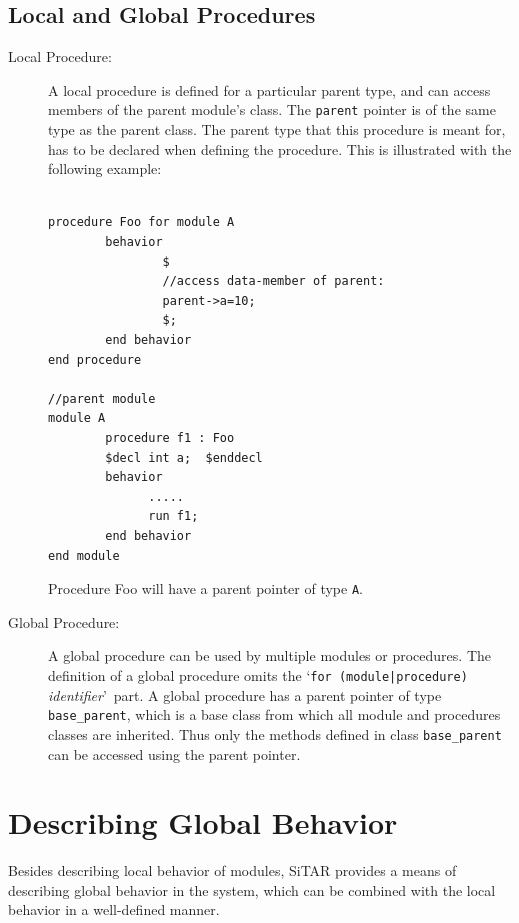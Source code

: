 \documentclass[12pt,a4paper]{report}
\begin{document}
	\subsection{Local and Global Procedures}
	\begin{description}
	\item[Local Procedure:] A local procedure is defined for a
	particular parent type, and can access members of the parent module's class.
	The \texttt{parent} pointer is of the same type as the parent class.
	The parent type that this procedure is meant for, has to be declared when defining
	the procedure. This is illustrated with the following example:
        
\begin{verbatim}

procedure Foo for module A
        behavior 
                $ 
                //access data-member of parent:
                parent->a=10;
                $;
        end behavior
end procedure

//parent module
module A
        procedure f1 : Foo
        $decl int a;  $enddecl
        behavior 
              .....
              run f1;
        end behavior
end module
\end{verbatim}
	Procedure Foo will have a parent pointer of type \texttt{A}.

	\item[Global Procedure:] 
	A global procedure can be used by multiple modules or procedures.
	The definition of a global procedure omits
	the \lq\texttt{for (module|procedure)} \textit{identifier}\rq\  
	part. A global procedure has a parent pointer of type
	\texttt{base\_parent}, which is a base class from which all module 
	and procedures classes are inherited. Thus only the methods defined 
	in class \texttt{base\_parent} can be accessed using the parent pointer.
	\end{description}



		
	\section{Describing Global Behavior}
	Besides describing local behavior of modules, SiTAR provides a means of
	describing global behavior in the system, which can be combined with the 
	local behavior in a well-defined manner.
\end{document}

